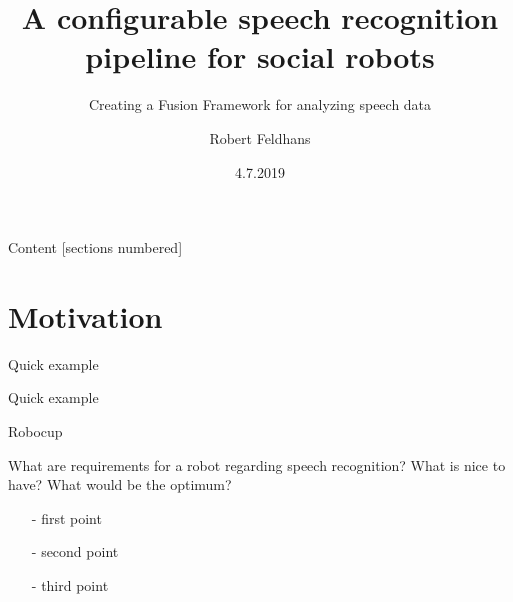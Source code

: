 \documentclass{beamer}
\title{A configurable speech recognition pipeline for social robots}
\subtitle{Creating a Fusion Framework for analyzing speech data}
\date{4.7.2019}
\institute{Master thesis}
\author{Robert Feldhans}
\begin{document}
	\maketitle
	
	\begin{frame}{Content}
		[sections numbered]
		\tableofcontents[hideallsubsections]
	\end{frame}
	
	\section{Motivation}
	
	\begin{frame}{Quick example}
	\end{frame}
	\begin{frame}{Quick example}
		\centering
	\end{frame}
	
	\begin{frame}{Robocup}
		
		\begin{alertblock}{What are requirements for a robot regarding speech recognition? What is nice to have? What would be the optimum?}
			\pause
			\begin{itemize}
				\item[-] first point
				\item[-] second point
				\item[-] third point
			\end{itemize}
		\end{alertblock}
		
	\end{frame}
	
\end{document}
